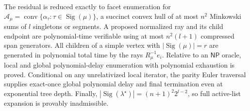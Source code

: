 The residual is reduced exactly to facet enumeration for \(\mathcal A_\mu=\operatorname{conv}\{\alpha_\tau:\tau\in\operatorname{Sig}(\mu)\}\), a succinct convex hull of at most \(n^2\) Minkowski sums of \(l\) singletons or segments. A proposed normalized ray and its child endpoint are polynomial-time verifiable using at most \(n^2(l+1)\) compressed span generators. All children of a simple vertex with \(|\operatorname{Sig}(\mu)|=r\) are generated in polynomial total time by the rays \(R_\mu^{-1}e_i\). Relative to an \(\mathsf{NP}\) oracle, local and global polynomial-delay enumeration with polynomial exhaustion is proved. Conditional on any unrelativized local iterator, the parity Euler traversal supplies exact-once global polynomial delay and final termination even at exponential tree depth. Finally, \(|\operatorname{Sig}(\lambda^\star)|=(n+1)^2 2^{l-2}\), so full active-list expansion is provably inadmissible.